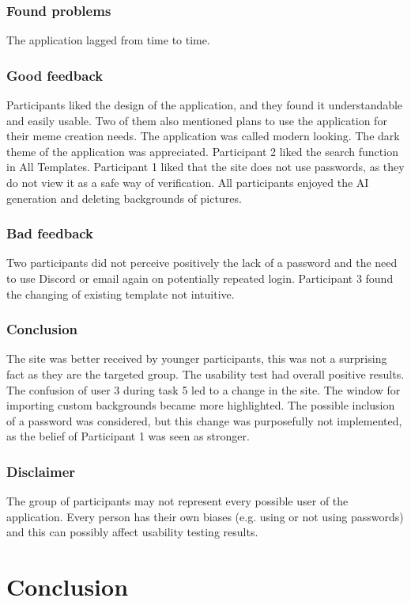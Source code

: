 \subsection{Found problems}
The application lagged from time to time.

\subsection{Good feedback}
Participants liked the design of the application, and they found it understandable and easily usable. Two of them also mentioned plans to use the application for their meme creation needs. The application was called modern looking. The dark theme of the application was appreciated. Participant 2 liked the search function in All Templates. Participant 1 liked that the site does not use passwords, as they do not view it as a safe way of verification. All participants enjoyed the AI generation and deleting backgrounds of pictures.

\subsection{Bad feedback}
Two participants did not perceive positively the lack of a password and the need to use Discord or email again on potentially repeated login. Participant 3 found the changing of existing template not intuitive.

\subsection{Conclusion}
The site was better received by younger participants, this was not a surprising fact as they are the targeted group. The usability test had overall positive results.  The confusion of user 3 during task 5 led to a change in the site. The window for importing custom backgrounds became more highlighted. The possible inclusion of a password was considered, but this change was purposefully not implemented, as the belief of Participant 1 was seen as stronger.

\subsection{Disclaimer}
The group of participants may not represent every possible user of the application. Every person has their own biases (e.g. using or not using passwords) and this can possibly affect usability testing results.

\chapter{Conclusion}

